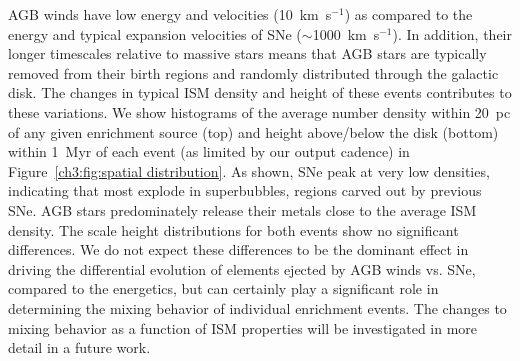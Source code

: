 AGB winds have low energy and velocities (10~km~s$^{-1}$) as compared to the energy and typical expansion velocities of SNe ($\sim$1000~km~s$^{-1}$). In addition, their longer timescales relative to massive stars means that AGB stars are typically removed from their birth regions and randomly distributed through the galactic disk. The changes in typical ISM density and height of these events contributes to these variations. We show histograms of the average number density within 20~pc of any given enrichment source (top) and height above/below the disk (bottom) within 1~Myr of each event (as limited by our output cadence) in Figure~\ref{ch3:fig:spatial distribution}. As shown, SNe peak at very low densities, indicating that most explode in superbubbles, regions carved out by previous SNe. AGB stars predominately release their metals close to the average ISM density. The scale height distributions for both events show no significant differences. We do not expect these differences to be the dominant effect in driving the differential evolution of elements ejected by AGB winds vs. SNe, compared to the energetics, but can certainly play a significant role in determining the mixing behavior of individual enrichment events. The changes to mixing behavior as a function of ISM properties will be investigated in more detail in a future work.

